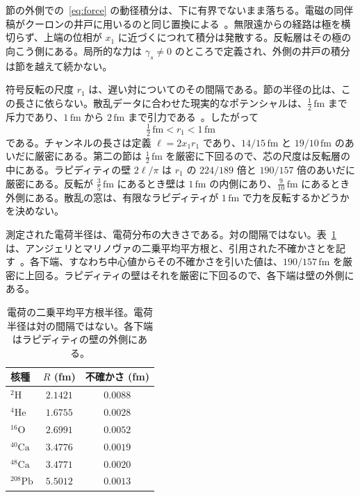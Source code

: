 \documentclass[a4paper]{article}
\begin{document}
節の外側での~\eqref{eq:force} の動径積分は、下に有界でないまま落ちる。電磁の同伴稿がクーロンの井戸に用いるのと同じ置換による~\cite{dst-shell}。無限遠からの経路は極を横切らず、上端の位相が \(x_1\) に近づくにつれて積分は発散する。反転層はその極の向こう側にある。局所的な力は \(\gamma_s\neq 0\) のところで定義され、外側の井戸の積分は節を越えて続かない。

符号反転の尺度 \(r_1\) は、遅い対についてのその間隔である。節の半径の比は、この長さに依らない。散乱データに合わせた現実的なポテンシャルは、\(\tfrac12\,\mathrm{fm}\) まで斥力であり、\(1\,\mathrm{fm}\) から \(2\,\mathrm{fm}\) まで引力である~\cite{wiringa1995}。したがって
\[
\tfrac12\,\mathrm{fm}<r_1<1\,\mathrm{fm}
\]
である。チャンネルの長さは定義 \(\ell=2x_1 r_1\) であり、\(14/15\,\mathrm{fm}\) と \(19/10\,\mathrm{fm}\) のあいだに厳密にある。第二の節は \(\tfrac12\,\mathrm{fm}\) を厳密に下回るので、芯の尺度は反転層の中にある。ラピディティの壁 \(2\ell/\pi\) は \(r_1\) の \(224/189\) 倍と \(190/157\) 倍のあいだに厳密にある。反転が \(\tfrac35\,\mathrm{fm}\) にあるとき壁は \(1\,\mathrm{fm}\) の内側にあり、\(\tfrac9{10}\,\mathrm{fm}\) にあるとき外側にある。散乱の窓は、有限なラピディティが \(1\,\mathrm{fm}\) で力を反転するかどうかを決めない。

測定された電荷半径は、電荷分布の大きさである。対の間隔ではない。表~\ref{tab:radii} は、アンジェリとマリノヴァの二乗平均平方根と、引用された不確かさとを記す~\cite{angeli2013}。各下端、すなわち中心値からその不確かさを引いた値は、\(190/157\,\mathrm{fm}\) を厳密に上回る。ラピディティの壁はそれを厳密に下回るので、各下端は壁の外側にある。

\begin{table}[htbp]
\centering
\caption{電荷の二乗平均平方根半径。電荷半径は対の間隔ではない。各下端はラピディティの壁の外側にある。}
\label{tab:radii}
\begin{tabular}{lcc}
\hline
核種 & \(R\) (fm) & 不確かさ (fm) \\
\hline
\({}^{2}\mathrm{H}\) & \(2.1421\) & \(0.0088\) \\
\({}^{4}\mathrm{He}\) & \(1.6755\) & \(0.0028\) \\
\({}^{16}\mathrm{O}\) & \(2.6991\) & \(0.0052\) \\
\({}^{40}\mathrm{Ca}\) & \(3.4776\) & \(0.0019\) \\
\({}^{48}\mathrm{Ca}\) & \(3.4771\) & \(0.0020\) \\
\({}^{208}\mathrm{Pb}\) & \(5.5012\) & \(0.0013\) \\
\hline
\end{tabular}
\end{table}
\end{document}
